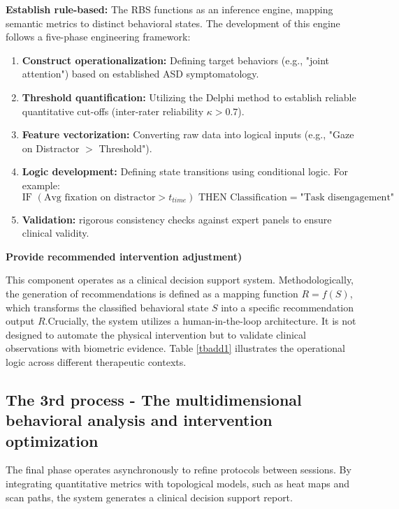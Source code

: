 \textbf{Establish rule-based:} The RBS functions as an inference engine, mapping semantic metrics to distinct behavioral states. The development of this engine follows a five-phase engineering framework:
\begin{enumerate}
    \item \textbf{Construct operationalization:} Defining target behaviors (e.g., "joint attention") based on established ASD symptomatology.
    \item \textbf{Threshold quantification:} Utilizing the Delphi method to establish reliable quantitative cut-offs (inter-rater reliability $\kappa > 0.7$).
    \item \textbf{Feature vectorization:} Converting raw data into logical inputs (e.g., "Gaze on Distractor $>$ Threshold").
    \item \textbf{Logic development:} Defining state transitions using conditional logic. For example:
    $$\text{IF } (\text{Avg fixation on distractor} > t_{time}) \text{ THEN } \text{Classification} = \text{"Task disengagement"}$$
    \item \textbf{Validation:} rigorous consistency checks against expert panels to ensure clinical validity.
\end{enumerate}


 
\textbf{Provide recommended intervention adjustment)}

This component operates as a clinical decision support system. Methodologically, the generation of recommendations is defined as a mapping function $R = f(S)$, which transforms the classified behavioral state $S$ into a specific recommendation output $R$.Crucially, the system utilizes a human-in-the-loop architecture. It is not designed to automate the physical intervention but to validate clinical observations with biometric evidence. Table \ref{tbadd1} illustrates the operational logic across different therapeutic contexts.



\subsection{The 3rd process - The multidimensional behavioral analysis and intervention optimization}

The final phase operates asynchronously to refine protocols between sessions. By integrating quantitative metrics with topological models, such as heat maps and scan paths, the system generates a clinical decision support report.

